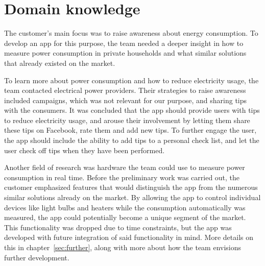 \section{Domain knowledge}
The customer's main focus was to raise awareness about energy consumption. To develop an app for this purpose, the team needed a deeper insight in how to measure power consumption in private households and what similar solutions that already existed on the market.

To learn more about power consumption and how to reduce electricity usage, the team contacted electrical power providers. Their strategies to raise awareness included campaigns, which was not relevant for our purpose, and sharing tips with the consumers. It was concluded that the app should provide users with tips to reduce electricity usage, and arouse their involvement by letting them share these tips on Facebook, rate them and add new tips. To further engage the user, the app should include the ability to add tips to a personal check list, and let the user check off tips when they have been performed.

Another field of research was hardware the team could use to measure power consumption in real time. Before the preliminary work was carried out, the customer emphasized features that would distinguish the app from the numerous similar solutions already on the market. By allowing the app to control individual devices like light bulbs and heaters while the consumption automatically was measured, the app could potentially become a unique segment of the market. This functionality was dropped due to time constraints, but the app was developed with future integration of said functionality in mind. More details on this in chapter~\ref{sec:further}, along with more about how the team envisions further development.

